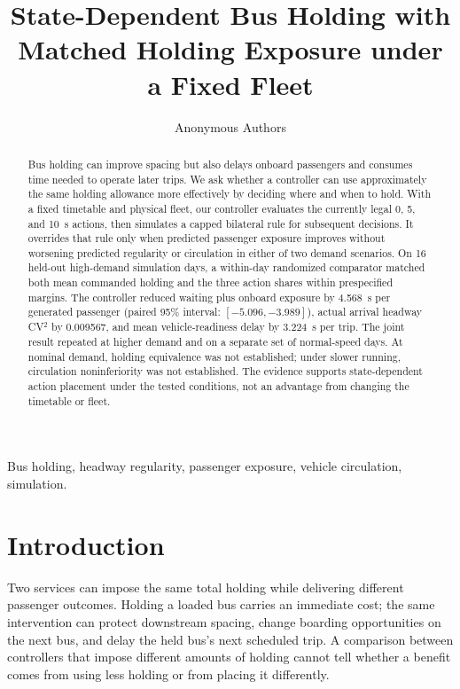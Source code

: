 \documentclass[journal]{IEEEtran}
\begin{document}
\title{State-Dependent Bus Holding with Matched Holding Exposure under a Fixed Fleet}
\author{Anonymous Authors}
\maketitle

\begin{abstract}
Bus holding can improve spacing but also delays onboard passengers and consumes time needed to operate later trips. We ask whether a controller can use approximately the same holding allowance more effectively by deciding where and when to hold. With a fixed timetable and physical fleet, our controller evaluates the currently legal 0, 5, and 10~s actions, then simulates a capped bilateral rule for subsequent decisions. It overrides that rule only when predicted passenger exposure improves without worsening predicted regularity or circulation in either of two demand scenarios. On 16 held-out high-demand simulation days, a within-day randomized comparator matched both mean commanded holding and the three action shares within prespecified margins. The controller reduced waiting plus onboard exposure by 4.568~s per generated passenger (paired 95\% interval: $[-5.096,-3.989]$), actual arrival headway CV$^2$ by 0.009567, and mean vehicle-readiness delay by 3.224~s per trip. The joint result repeated at higher demand and on a separate set of normal-speed days. At nominal demand, holding equivalence was not established; under slower running, circulation noninferiority was not established. The evidence supports state-dependent action placement under the tested conditions, not an advantage from changing the timetable or fleet.
\end{abstract}

\begin{IEEEkeywords}
Bus holding, headway regularity, passenger exposure, vehicle circulation, simulation.
\end{IEEEkeywords}

\section{Introduction}
Two services can impose the same total holding while delivering different passenger outcomes. Holding a loaded bus carries an immediate cost; the same intervention can protect downstream spacing, change boarding opportunities on the next bus, and delay the held bus's next scheduled trip. A comparison between controllers that impose different amounts of holding cannot tell whether a benefit comes from using less holding or from placing it differently.
\end{document}
